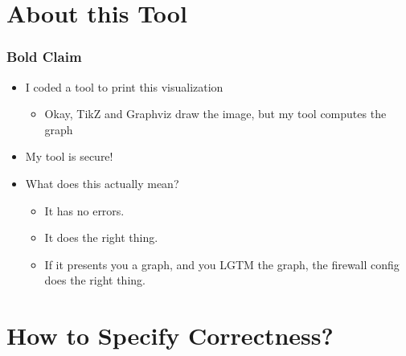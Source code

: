 \documentclass[aspectratio=169]{beamer}
\begin{document}
\section{About this Tool}

\begin{frame}
	\frametitle{Bold Claim}
	\begin{itemize}
		\item I coded a tool to print this visualization
		\begin{itemize}
			\item<2-> Okay, TikZ and Graphviz draw the image, but my tool computes the graph
		\end{itemize}
	\end{itemize}
	\begin{itemize}
		\item<4-> My tool is secure!
		\item<5-> What does this actually mean?
		\begin{itemize}
			\item<6-> It has no errors.
			\item<7-> It does the right thing.
			\item<8-> If it presents you a graph, and you LGTM the graph, the firewall config does the right thing.
		\end{itemize}
	\end{itemize}
\end{frame}


\section{How to Specify Correctness?}
\end{document}
